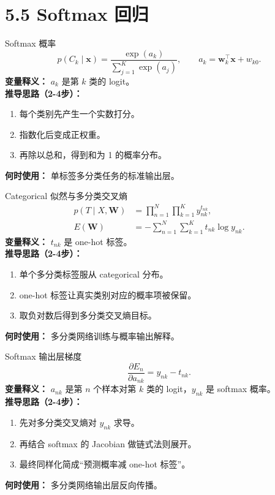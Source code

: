 ﻿\documentclass[11pt]{article}
\begin{document}
\section{5.5 Softmax 回归}
\begin{formulabox}{Softmax 概率}
\begin{equation}
p(C_k\mid \mathbf x)=\frac{\exp(a_k)}{\sum_{j=1}^{K}\exp(a_j)},
\qquad a_k=\mathbf w_k^\top\mathbf x+w_{k0}.
\end{equation}
\textbf{变量释义：} $a_k$ 是第 $k$ 类的 logit。\\
\textbf{推导思路（2-4步）：}
\begin{enumerate}[leftmargin=1.6em]
  \item 每个类别先产生一个实数打分。
  \item 指数化后变成正权重。
  \item 再除以总和，得到和为 1 的概率分布。
\end{enumerate}
\textbf{何时使用：} 单标签多分类任务的标准输出层。
\end{formulabox}

\begin{formulabox}{Categorical 似然与多分类交叉熵}
\begin{align}
p(T\mid X,\mathbf W)&=\prod_{n=1}^{N}\prod_{k=1}^{K} y_{nk}^{t_{nk}},\\
E(\mathbf W)&=-\sum_{n=1}^{N}\sum_{k=1}^{K} t_{nk}\log y_{nk}.
\end{align}
\textbf{变量释义：} $t_{nk}$ 是 one-hot 标签。\\
\textbf{推导思路（2-4步）：}
\begin{enumerate}[leftmargin=1.6em]
  \item 单个多分类标签服从 categorical 分布。
  \item one-hot 标签让真实类别对应的概率项被保留。
  \item 取负对数后得到多分类交叉熵目标。
\end{enumerate}
\textbf{何时使用：} 多分类网络训练与概率输出解释。
\end{formulabox}

\begin{formulabox}{Softmax 输出层梯度}
\begin{equation}
\frac{\partial E_n}{\partial a_{nk}} = y_{nk}-t_{nk}.
\end{equation}
\textbf{变量释义：} $a_{nk}$ 是第 $n$ 个样本对第 $k$ 类的 logit，$y_{nk}$ 是 softmax 概率。\\
\textbf{推导思路（2-4步）：}
\begin{enumerate}[leftmargin=1.6em]
\item 先对多分类交叉熵对 $y_{nk}$ 求导。
\item 再结合 softmax 的 Jacobian 做链式法则展开。
\item 最终同样化简成“预测概率减 one-hot 标签”。
\end{enumerate}
\textbf{何时使用：} 多分类网络输出层反向传播。
\end{formulabox}
\end{document}
